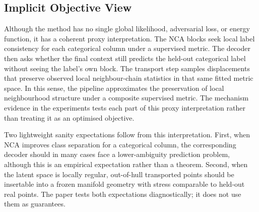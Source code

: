 \subsection{Implicit Objective View}

Although the method has no single global likelihood, adversarial loss, or
energy function, it has a coherent proxy interpretation. The NCA blocks seek
local label consistency for each categorical column under a supervised metric.
The decoder then asks whether the final context still predicts the held-out
categorical label without seeing the label's own block. The transport step
samples displacements that preserve observed local neighbour-chain statistics
in that same fitted metric space. In this sense, the pipeline approximates the
preservation of local neighbourhood structure under a composite supervised
metric. The mechanism evidence in the experiments tests each part of this
proxy interpretation rather than treating it as an optimised objective.

Two lightweight sanity expectations follow from this interpretation. First,
when NCA improves class separation for a categorical column, the corresponding
decoder should in many cases face a lower-ambiguity prediction problem,
although this is an empirical expectation rather than a theorem. Second, when
the latent space is locally regular, out-of-hull transported points should be
insertable into a frozen manifold geometry with stress comparable to held-out
real points. The paper tests both expectations diagnostically; it does not use
them as guarantees.

